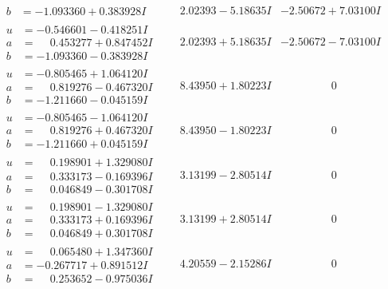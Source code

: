 \documentclass[1p]{elsarticle_modified}
\theoremstyle{definition}
\begin{document}
$$\begin{array}{c|c|c}
\begin{aligned}
b &= -1.093360 + 0.383928 I\end{aligned}
 & \phantom{-}2.02393 - 5.18635 I & -2.50672 + 7.03100 I \\ \hline\begin{aligned}
u &= -0.546601 - 0.418251 I \\
a &= \phantom{-}0.453277 + 0.847452 I \\
b &= -1.093360 - 0.383928 I\end{aligned}
 & \phantom{-}2.02393 + 5.18635 I & -2.50672 - 7.03100 I \\ \hline\begin{aligned}
u &= -0.805465 + 1.064120 I \\
a &= \phantom{-}0.819276 - 0.467320 I \\
b &= -1.211660 - 0.045159 I\end{aligned}
 & \phantom{-}8.43950 + 1.80223 I & \phantom{-0.000000 } 0 \\ \hline\begin{aligned}
u &= -0.805465 - 1.064120 I \\
a &= \phantom{-}0.819276 + 0.467320 I \\
b &= -1.211660 + 0.045159 I\end{aligned}
 & \phantom{-}8.43950 - 1.80223 I & \phantom{-0.000000 } 0 \\ \hline\begin{aligned}
u &= \phantom{-}0.198901 + 1.329080 I \\
a &= \phantom{-}0.333173 - 0.169396 I \\
b &= \phantom{-}0.046849 - 0.301708 I\end{aligned}
 & \phantom{-}3.13199 - 2.80514 I & \phantom{-0.000000 } 0 \\ \hline\begin{aligned}
u &= \phantom{-}0.198901 - 1.329080 I \\
a &= \phantom{-}0.333173 + 0.169396 I \\
b &= \phantom{-}0.046849 + 0.301708 I\end{aligned}
 & \phantom{-}3.13199 + 2.80514 I & \phantom{-0.000000 } 0 \\ \hline\begin{aligned}
u &= \phantom{-}0.065480 + 1.347360 I \\
a &= -0.267717 + 0.891512 I \\
b &= \phantom{-}0.253652 - 0.975036 I\end{aligned}
 & \phantom{-}4.20559 - 2.15286 I & \phantom{-0.000000 } 0 \\ \hline\begin{aligned}

\end{aligned}
\end{array}$$
\end{document}

